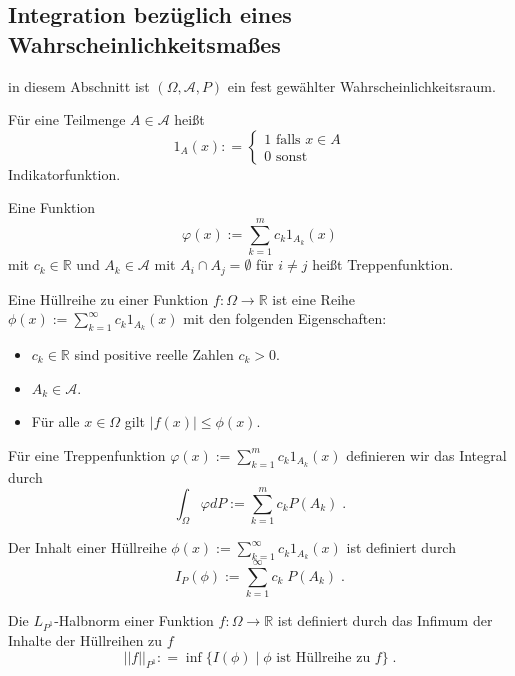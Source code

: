 \subsection{Integration bezüglich eines Wahrscheinlichkeitsmaßes}
in diesem Abschnitt ist  $(\Omega, \mathcal{A},P)$ ein fest gewählter Wahrscheinlichkeitsraum.

\begin{Definition}
Für eine Teilmenge $A \in \mathcal{A}$ heißt
$$ 1_A (x): = \begin{cases} 1 \text{  falls }   x \in A  \\  0  \text{  sonst}  \end{cases}$$
Indikatorfunktion.
\end{Definition}

\begin{Definition}
Eine Funktion 
$$ \varphi(x) := \sum_{k=1}^m c_k 1_{A_k}(x)$$ mit $c_k \in \mathbb{R}$ und $A_k \in \mathcal{A}$ mit $A_i \cap A_j = \emptyset$ für $i \neq j$
heißt Treppenfunktion.
\end{Definition}





\begin{Definition}
Eine Hüllreihe zu einer Funktion $f :\Omega \to \mathbb{R}$ ist eine Reihe $\phi(x):= \sum_{k=1}^{\infty} c_k  1_{A_k} (x)$ mit den folgenden Eigenschaften:
\begin{itemize}
\item $c_k \in \mathbb{R}$ sind positive reelle Zahlen $c_k >0$.
\item $A_k \in \mathcal{A}$.
\item Für alle $x \in \Omega$ gilt $|f(x) | \leq \phi(x)$.
\end{itemize}
\end{Definition}

 
\begin{Definition}
Für eine Treppenfunktion $ \varphi(x) := \sum_{k=1}^m c_k 1_{A_k}(x)$ definieren wir das Integral durch
$$\int_{\Omega} \varphi dP := \sum_{k =1}^m  c_k P(A_k) \; . $$
\end{Definition}


\begin{Definition}
Der Inhalt einer Hüllreihe $\phi(x):= \sum_{k=1}^{\infty} c_k  1_{A_k} (x)$ ist definiert durch 
$$I_P (\phi) := \sum_{k=1}^{\infty} c_k \;  P(A_k) \; .$$
\end{Definition}


\begin{Definition}
Die $L_{P^1}$-Halbnorm einer Funktion $f : \Omega\to \mathbb{R}$ ist definiert durch das Infimum der Inhalte der Hüllreihen zu $f$
$$ || f ||_{P^1} : = \inf  \biggl \{   I(\phi) \; | \; \phi  \text{ ist Hüllreihe zu  }  f \biggr \} \; .$$
\end{Definition}



